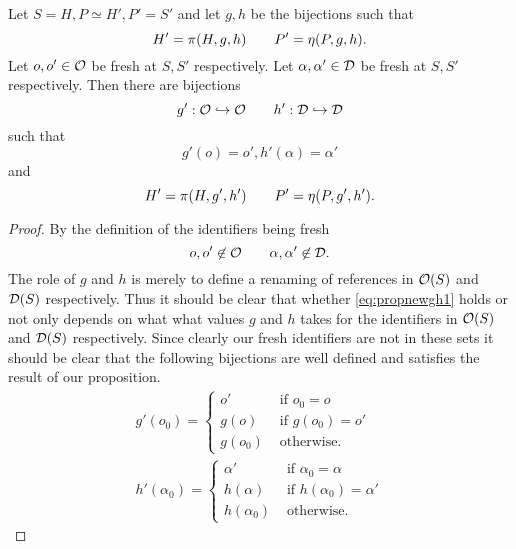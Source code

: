 \begin{proposition}
  Let $S = H, P \simeq H', P' = S'$ and let $g, h$ be the bijections such that
  \begin{equation} \label{eq:propnewgh1}
    H' = \pi(H, g, h) \quad\quad P' = \eta(P, g, h).
  \end{equation}
  Let $o, o' \in \mathcal{O}$ be fresh at $S, S'$ respectively.
  Let $\alpha, \alpha' \in \mathcal{D}$ be fresh at $S, S'$ respectively.
  Then there are bijections
  \begin{equation*}
    g': \mathcal{O} \hookrightarrow \mathcal{O} \quad\quad h': \mathcal{D} \hookrightarrow \mathcal{D}
  \end{equation*}
  such that 
  \begin{equation} \label{eq:propnewgh2}
    g'(o) = o', h'(\alpha) = \alpha'
  \end{equation} 
  and
  \begin{equation} \label{eq:propnewgh3}
    H' = \pi(H, g', h') \quad\quad P' = \eta(P, g', h').
  \end{equation}
\end{proposition}

\begin{proof}
  By the definition of the identifiers being fresh
  \begin{equation*}
    o, o' \not\in \mathcal{O} \quad\quad \alpha, \alpha' \not\in \mathcal{D}.
  \end{equation*}
  The role of $g$ and $h$ is merely to define a renaming of references in
  $\mathcal{O}(S)$ and $\mathcal{D}(S)$ respectively. Thus it should be clear that whether
  \eqref{eq:propnewgh1} holds or not only depends on what what values
  $g$ and $h$ takes for the identifiers in $\mathcal{O}(S)$ and $\mathcal{D}(S)$
  respectively. Since clearly our fresh identifiers are not in these sets it should
  be clear that the following bijections are well defined and satisfies the
  result of our proposition.
  \begin{equation*}
    \begin{gathered}
      g'(o_{0}) =
      \begin{cases}
        o' & \text{ if } o_0 = o \\
        g(o) &\text{ if } g(o_0) = o' \\
        g(o_{0}) & \text{ otherwise.} 
      \end{cases} \\
      h'(\alpha_0) =
      \begin{cases}
        \alpha' & \text{ if } \alpha_0 = \alpha \\
        h(\alpha) & \text{ if } h(\alpha_0) = \alpha' \\
        h(\alpha_0) & \text{ otherwise.} 
      \end{cases}
    \end{gathered}
  \end{equation*}
\end{proof}

